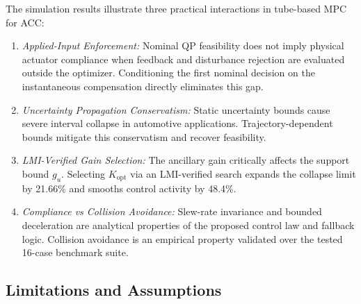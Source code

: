 \documentclass[journal]{IEEEtran}
\begin{document}
The simulation results illustrate three practical interactions in tube-based MPC for ACC:
\begin{enumerate}
    \item \emph{Applied-Input Enforcement:} Nominal QP feasibility does not imply physical actuator compliance when feedback and disturbance rejection are evaluated outside the optimizer. Conditioning the first nominal decision on the instantaneous compensation directly eliminates this gap.
    \item \emph{Uncertainty Propagation Conservatism:} Static uncertainty bounds cause severe interval collapse in automotive applications. Trajectory-dependent bounds mitigate this conservatism and recover feasibility.
    \item \emph{LMI-Verified Gain Selection:} The ancillary gain critically affects the support bound $g_u$. Selecting $K_{\mathrm{opt}}$ via an LMI-verified search expands the collapse limit by 21.66\% and smooths control activity by 48.4\%.
    \item \emph{Compliance vs Collision Avoidance:} Slew-rate invariance and bounded deceleration are analytical properties of the proposed control law and fallback logic. Collision avoidance is an empirical property validated over the tested 16-case benchmark suite.
\end{enumerate}

\subsection{Limitations and Assumptions}
\end{document}
